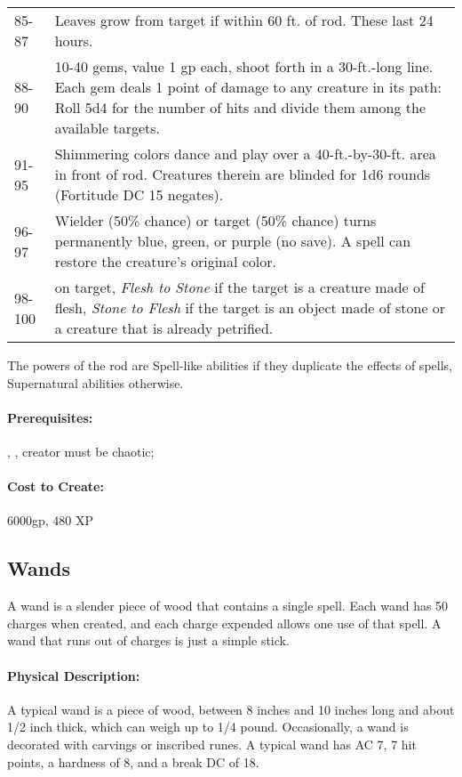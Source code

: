 \begin{table*}
\begin{tabular}{lp{}}
85-87&Leaves grow from target if within 60 ft. of rod. These last 24 hours.\\
88-90&10-40 gems, value 1 gp each, shoot forth in a 30-ft.-long line. Each gem deals 1 point of damage to any creature in its path: Roll 5d4 for the number of hits and divide them among the available targets.\\
91-95&Shimmering colors dance and play over a 40-ft.-by-30-ft. area in front of rod. Creatures therein are blinded for 1d6 rounds (Fortitude DC 15 negates).\\
96-97&Wielder (50\% chance) or target (50\% chance) turns permanently blue, green, or purple (no save). A \nameref{Spell:RemoveCurse} spell can restore the creature's original color.\\
98-100&\nameref{Spell:TransmuteFleshAndStone} on target, \emph{Flesh to Stone} if the target is a creature made of flesh, \emph{Stone to Flesh} if the target is an object made of stone or a creature that is already petrified.\\
\bottomrule
\end{tabular}
\end{table*}
The powers of the rod are Spell-like abilities if they duplicate the effects of spells, Supernatural abilities otherwise.

\paragraph{Prerequisites:} , , creator must be chaotic; 

\paragraph{Cost to Create:} 6000gp, 480 XP
\subsection{Wands}
\label{Item:Wands}
A wand is a slender piece of wood that contains a single spell. Each wand has 50
charges when created, and each charge expended allows one use of that spell. A
wand that runs out of charges is just a simple stick.

\paragraph{Physical Description:} A typical wand is a piece of wood,
between 8 inches and 10 inches long and about 1/2 inch thick, which
can weigh up to 1/4 pound. Occasionally, a wand is decorated with carvings or
inscribed runes. A typical wand has AC 7, 7 hit
points, a hardness of 8, and a break DC of 18.

